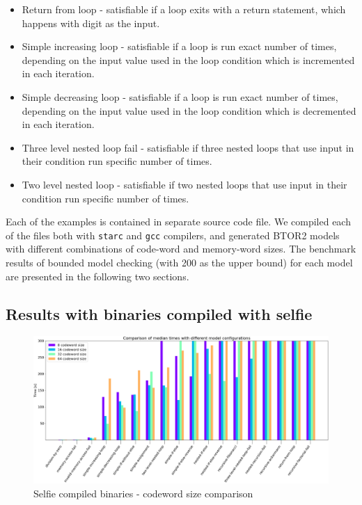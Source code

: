 \documentclass[12pt]{article}
\begin{document}
\begin{itemize}
    \item Return from loop - satisfiable if a loop exits with a return
        statement, which happens with digit as the input.
    \item Simple increasing loop - satisfiable if a loop is run exact number of
        times, depending on the input value used in the loop condition which is
        incremented in each iteration.
    \item Simple decreasing loop - satisfiable if a loop is run exact number of
        times, depending on the input value used in the loop condition which is
        decremented in each iteration. 
    \item Three level nested loop fail - satisfiable if three nested loops that
        use input in their condition run specific number of times.
    \item Two level nested loop - satisfiable if two nested loops that use
        input in their condition run specific number of times.

\end{itemize}

Each of the examples is contained in separate source code file. We compiled
each of the files both with \texttt{starc} and \texttt{gcc} compilers, and
generated BTOR2 models with different combinations of code-word and memory-word
sizes. The benchmark results of bounded model checking (with 200 as the upper
bound) for each model are presented in the following two sections.

\subsection{Results with binaries compiled with selfie}

\begin{figure}[!h]
    \includegraphics[width=\linewidth]{assets/benches/codeword_selfie_linear.png}
    \centering
    \caption{
        Selfie compiled binaries - codeword size comparison
    }
    \label{fig:codeword_selfie_linear}
\end{figure}
\end{document}
